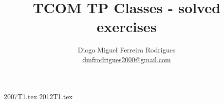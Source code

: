 \documentclass[a4paper]{article}
\title{TCOM TP Classes - solved exercises}
\author{Diogo Miguel Ferreira Rodrigues \\ \href{mailto:dmfrodrigues2000@gmail.com}{dmfrodrigues2000@gmail.com}}
\date{}
\begin{document}
\begingroup
	\maketitle
	\let\clearpage\relax
	\setcounter{tocdepth}{2}
	\tableofcontents
\endgroup
\setcounter{section}{6}
{2007T1.tex}
{2012T1.tex}
\end{document}
